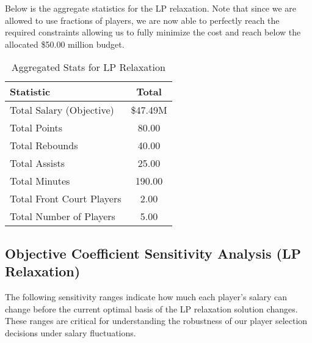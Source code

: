 \documentclass[a4paper,11pt]{article}
\begin{document}
Below is the aggregate statistics for the LP relaxation. Note that since we are allowed to use fractions of players, we are now able to perfectly reach the required constraints allowing us to fully minimize the cost and reach below the allocated \$50.00 million budget.
\begin{table}[h!]
    \centering
    \renewcommand{\arraystretch}{1.2} %
    \begin{tabular}{lc}
        \hline
        \textbf{Statistic}          & \textbf{Total} \\
        \hline
        Total Salary (Objective)    & \$47.49M         \\ %
        Total Points                & 80.00          \\ 
        Total Rebounds              & 40.00          \\ 
        Total Assists               & 25.00          \\ 
        Total Minutes               & 190.00         \\
        Total Front Court Players   & 2.00           \\ 
        Total Number of Players     & 5.00           \\ 
        \hline
    \end{tabular}
    \caption{Aggregated Stats for LP Relaxation}
    \label{tab:team_totals_LP}
\end{table}

\newpage

\subsection{Objective Coefficient Sensitivity Analysis (LP Relaxation)}

The following sensitivity ranges indicate how much each player's salary can change before the current optimal basis of the LP relaxation solution changes. These ranges are critical for understanding the robustness of our player selection decisions under salary fluctuations.
\end{document}
